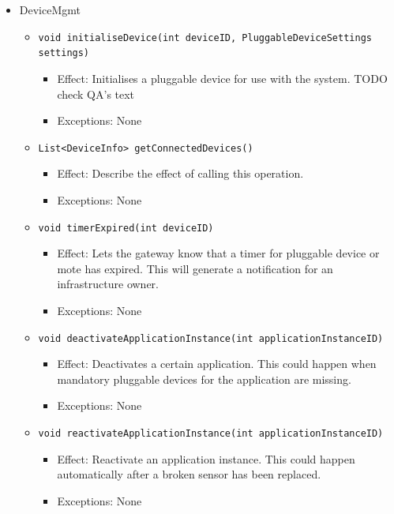 \begin{itemize}
            \item DeviceMgmt
            \begin{itemize}
                \item \texttt{void initialiseDevice(int deviceID, PluggableDeviceSettings settings)}
                \begin{itemize}
                    \item Effect: Initialises a pluggable device for use with the system. TODO check QA's text
                    \item Exceptions: None
                \end{itemize}
                \item \texttt{List<DeviceInfo> getConnectedDevices()}
                \begin{itemize}
                    \item Effect: Describe the effect of calling this operation.
                    \item Exceptions: None
                \end{itemize}
                \item \texttt{void timerExpired(int deviceID)}
                \begin{itemize}
                    \item Effect: Lets the gateway know that a timer for pluggable device or mote has expired.
                                  This will generate a notification for an infrastructure owner.
                    \item Exceptions: None
                \end{itemize}
                \item \texttt{void deactivateApplicationInstance(int applicationInstanceID)}
                \begin{itemize}
                    \item Effect: Deactivates a certain application. This could happen when
                                  mandatory pluggable devices for the application are missing.
                    \item Exceptions: None
                \end{itemize}
                \item \texttt{void reactivateApplicationInstance(int applicationInstanceID)}
                \begin{itemize}
                    \item Effect: Reactivate an application instance. This could happen
                                  automatically after a broken sensor has been replaced.
                    \item Exceptions: None
                \end{itemize}
            \end{itemize}


\end{itemize}
